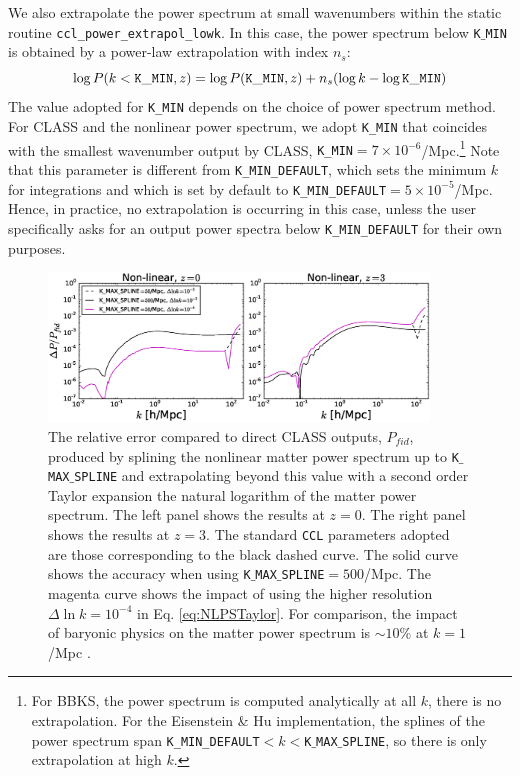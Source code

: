 \documentclass[\docopts]{\docclass}
\newcommand{\ccl}{{\tt CCL}\xspace}
\begin{document}
We also extrapolate the power spectrum at small wavenumbers within the static routine {\tt ccl\_power\_extrapol\_lowk}. In this case, the power spectrum below {\tt K$\_$MIN} is obtained by a power-law extrapolation with index $n_s$:
\begin{equation}
  \log P(k<{\tt K\_MIN},z) = \log P({\tt K\_MIN},z) + n_s (\log k-\log{\tt K\_MIN})
\end{equation}
The value adopted for {\tt K\_MIN} depends on the choice of power spectrum method. For CLASS and the nonlinear power spectrum, we adopt {\tt K\_MIN} that coincides with the smallest wavenumber output by CLASS, {\tt K\_MIN}$=7\times 10^{-6}$/Mpc.\footnote{For BBKS, the power spectrum is computed analytically at all $k$, there is no extrapolation. For the Eisenstein \& Hu implementation, the splines of the power spectrum span {\tt K\_MIN\_DEFAULT}$<k<${\tt K$\_$MAX$\_$SPLINE}, so there is only extrapolation at high $k$.} Note that this parameter is different from {\tt K\_MIN\_DEFAULT}, which sets the minimum $k$ for integrations and which is set by default to {\tt K\_MIN\_DEFAULT}$=5\times 10^{-5}$/Mpc. Hence, in practice, no extrapolation is occurring in this case, unless the user specifically asks for an output power spectra below {\tt K\_MIN\_DEFAULT} for their own purposes.


\begin{figure}
\centering
\includegraphics[width=0.9\textwidth]{PS_converge_nonlin.eps}
\caption{The relative error compared to direct CLASS outputs, $P_{fid}$, produced by splining the nonlinear matter power spectrum up to {\tt K$\_$MAX$\_$SPLINE} and extrapolating beyond this value with a second order Taylor expansion the natural logarithm of the matter power spectrum. The left panel shows the results at $z=0$. The right panel shows the results at $z=3$. The standard \ccl parameters adopted are those corresponding to the black dashed curve. The solid curve shows the accuracy when using {\tt K$\_$MAX$\_$SPLINE}$=500$/Mpc. The magenta curve shows the impact of using the higher resolution $\Delta\ln k=10^{-4}$ in Eq. \ref{eq:NLPSTaylor}. For comparison, the impact of baryonic physics on the matter power spectrum is $\sim 10\%$ at $k=1$/Mpc \citep{Schneider15}.}
\label{fig:NLextrapol}
\end{figure}
\end{document}
